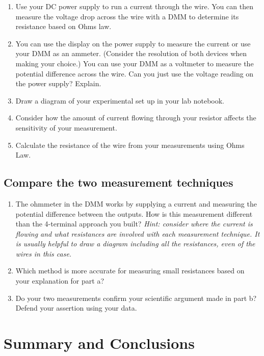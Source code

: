 \documentclass[10pt]{PhysLab1C} %
\begin{document}
\begin{enumerate}
\def\labelenumi{\arabic{enumi}.}
\item
  Use your DC power supply to run a current through the wire. You can
  then measure the voltage drop across the wire with a DMM to determine
  its resistance based on Ohm\textquotesingle s law.
\item
  You can use the display on the power supply to measure the current or
  use your DMM as an ammeter. (Consider the resolution of both devices
  when making your choice.) You can use your DMM as a voltmeter to
  measure the potential difference across the wire. Can you just use the
  voltage reading on the power supply? Explain.
\item
  Draw a diagram of your experimental set up in your lab notebook.
\item
  Consider how the amount of current flowing through your resistor
  affects the sensitivity of your measurement.
\item
  Calculate the resistance of the wire from your measurements using
  Ohm\textquotesingle s Law.
\end{enumerate}

\subsection{Compare the two measurement techniques}


\begin{enumerate}
\def\labelenumi{\arabic{enumi}.}
\item
  The ohmmeter in the DMM works by supplying a current and measuring the
  potential difference between the outputs. How is this measurement
  different than the 4-terminal approach you built? \emph{Hint: consider
  where the current is flowing and what resistances are involved with
  each measurement technique. It is usually helpful to draw a diagram
  including all the resistances, even of the wires in this case.}
\item
  Which method is more accurate for measuring small resistances based on
  your explanation for part a?
\item
  Do your two measurements confirm your scientific argument made in part
  b? Defend your assertion using your data.
\end{enumerate}


\section{Summary and Conclusions}
\end{document}
